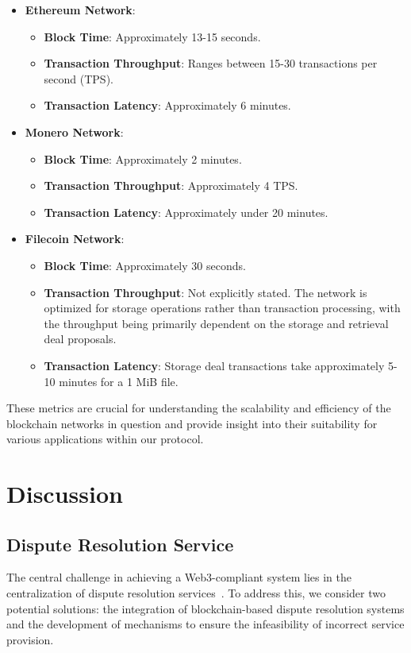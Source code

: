 \documentclass[pdftex,twocolumn,epjc3]{svjour3}
\begin{document}
{\begin{itemize}
    \item \textbf{Ethereum Network}:
    \begin{itemize}
        \item \textbf{Block Time}: Approximately 13-15 seconds.
        \item \textbf{Transaction Throughput}: Ranges between 15-30 transactions per second (TPS).
        \item \textbf{Transaction Latency}: Approximately 6 minutes.
    \end{itemize}
    
    \item \textbf{Monero Network}:
    \begin{itemize}
        \item \textbf{Block Time}: Approximately 2 minutes.
        \item \textbf{Transaction Throughput}: Approximately 4 TPS.
        \item \textbf{Transaction Latency}: Approximately under 20 minutes.
    \end{itemize}
    
    \item \textbf{Filecoin Network}:
    \begin{itemize}
        \item \textbf{Block Time}: Approximately 30 seconds.
        \item \textbf{Transaction Throughput}: Not explicitly stated. The network is optimized for storage operations rather than transaction processing, with the throughput being primarily dependent on the storage and retrieval deal proposals.
        \item \textbf{Transaction Latency}: Storage deal transactions take approximately 5-10 minutes for a 1 MiB file.
    \end{itemize}
\end{itemize}

These metrics are crucial for understanding the scalability and efficiency of the blockchain networks in question and provide insight into their suitability for various applications within our protocol.

\section{Discussion}
\label{sec:discussion}

\subsection{Dispute Resolution Service}\label{sec:decentralised-justice}
The central challenge in achieving a Web3-compliant system lies in the centralization of dispute resolution services~\cite{ethereumWhatWeb3Why2023}. To address this, we consider two potential solutions: the integration of blockchain-based dispute resolution systems and the development of mechanisms to ensure the infeasibility of incorrect service provision.

}
\end{document}

